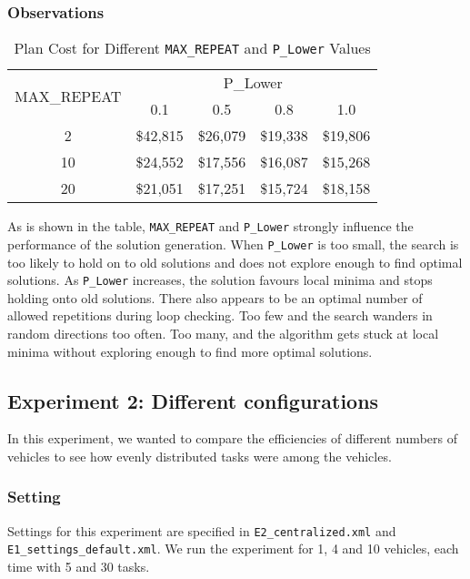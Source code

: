 \documentclass[11pt]{article}
\begin{document}
\subsubsection{Observations}


\begin{table}
	\centering
	\caption{Plan Cost for Different \texttt{MAX\_REPEAT} and \texttt{P\_Lower} Values}
	\begin{tabular}{|c|c|c|c|c|}
		\hline
		\multirow{2}{*}{MAX\_REPEAT} & \multicolumn{4}{c|}{P\_Lower} \\ \cline{2-5} 
		& 0.1 & 0.5 & 0.8 & 1.0 \\ \hline
		2 & \$42,815 & \$26,079 & \$19,338 & \$19,806 \\ \hline
		10 & \$24,552 & \$17,556 & \$16,087 & \$15,268 \\ \hline
		20 & \$21,051 & \$17,251 & \$15,724 & \$18,158 \\ \hline
	\end{tabular}
\end{table}


As is shown in the table, \texttt{MAX\_REPEAT} and \texttt{P\_Lower} strongly influence the performance of the solution generation. When \texttt{P\_Lower} is too small, the search is too likely to hold on to old solutions and does not explore enough to find optimal solutions. As \texttt{P\_Lower} increases, the solution favours local minima and stops holding onto old solutions. There also appears to be an optimal number of allowed repetitions during loop checking. Too few and the search wanders in random directions too often. Too many, and the algorithm gets stuck at local minima without exploring enough to find more optimal solutions.

\subsection{Experiment 2: Different configurations}
In this experiment, we wanted to compare the efficiencies of different numbers of vehicles to see how evenly distributed tasks were among the vehicles. 
\subsubsection{Setting}
Settings for this experiment are specified in \texttt{E2\_centralized.xml} and \texttt{E1\_settings\_default.xml}. We run the experiment for 1, 4 and 10 vehicles, each time with 5 and 30 tasks.\\
\end{document}

